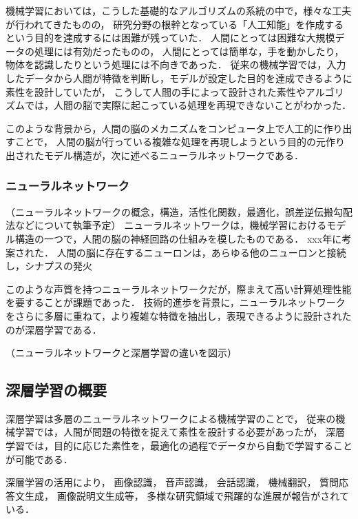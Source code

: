 機械学習においては，こうした基礎的なアルゴリズムの系統の中で，様々な工夫が行われてきたものの，
研究分野の根幹となっている「人工知能」を作成するという目的を達成するには困難が残っていた．
人間にとっては困難な大規模データの処理には有効だったものの，
人間にとっては簡単な，手を動かしたり，物体を認識したりという処理には不向きであった．
従来の機械学習では，入力したデータから人間が特徴を判断し，モデルが設定した目的を達成できるように素性を設計していたが，
こうして人間の手によって設計された素性やアルゴリズムでは，人間の脳で実際に起こっている処理を再現できないことがわかった．

このような背景から，人間の脳のメカニズムをコンピュータ上で人工的に作り出すことで，
人間の脳が行っている複雑な処理を再現しようという目的の元作り出されたモデル構造が，次に述べるニューラルネットワークである．


\subsubsection{ニューラルネットワーク}
（ニューラルネットワークの概念，構造，活性化関数，最適化，誤差逆伝搬勾配法などについて執筆予定）
ニューラルネットワークは，機械学習におけるモデル構造の一つで，人間の脳の神経回路の仕組みを模したものである．
xxx年に考案された．
人間の脳に存在するニューロンは，あらゆる他のニューロンと接続し，シナプスの発火

このような声質を持つニューラルネットワークだが，際まえて高い計算処理性能を要することが課題であった．
技術的進歩を背景に，ニューラルネットワークをさらに多層に重ねて，より複雑な特徴を抽出し，表現できるように設計されたのが深層学習である．

（ニューラルネットワークと深層学習の違いを図示）

\subsection{深層学習の概要}
深層学習は多層のニューラルネットワークによる機械学習のことで，
従来の機械学習では，人間が問題の特徴を捉えて素性を設計する必要があったが，
深層学習では，目的に応じた素性を，最適化の過程でデータから自動で学習することが可能である．

深層学習の活用により，
画像認識\cite{schroff2015facenet,szegedy2014going}，
音声認識\cite{hinton2012deep, bahdanau2015end}，
会話認識\cite{sak2015fast}，
機械翻訳\cite{sutskever2014sequence, dong2015multi}，
質問応答文生成\cite{yin2015neural}，
画像説明文生成\cite{xu2015show,vinyals2014show}等，
多様な研究領域で飛躍的な進展が報告がされている．

